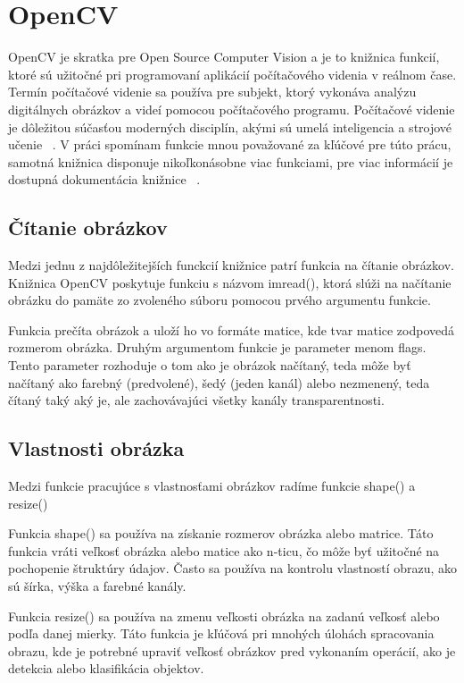 \section{OpenCV}
OpenCV je skratka pre Open Source Computer Vision a je to knižnica funkcií, ktoré sú užitočné pri programovaní 
aplikácií počítačového videnia v reálnom čase. Termín počítačové videnie sa používa pre subjekt, ktorý vykonáva 
analýzu digitálnych obrázkov a videí pomocou počítačového programu. Počítačové videnie je dôležitou súčasťou 
moderných disciplín, akými sú umelá inteligencia a strojové učenie ~\cite{tutorialspoint_opencv}. V práci 
spomínam funkcie mnou považované za kľúčové pre túto prácu, samotná knižnica disponuje nikoľkonásobne viac 
funkciami, pre viac informácií je dostupná dokumentácia knižnice ~\cite{documentation_opencv}.

\subsection{Čítanie obrázkov}
Medzi jednu z najdôležitejších funckcií knižnice patrí funkcia na čítanie obrázkov. Knižnica OpenCV poskytuje 
funkciu s názvom imread(), ktorá slúži na načítanie obrázku do pamäte zo zvoleného súboru pomocou prvého argumentu 
funkcie.  

Funkcia prečíta obrázok a uloží ho vo formáte matice, kde tvar matice zodpovedá rozmerom obrázka. Druhým argumentom 
funkcie je parameter menom flags. Tento parameter rozhoduje o tom ako je obrázok načítaný, teda môže byť načítaný 
ako farebný (predvolené), šedý (jeden kanál) alebo nezmenený, teda čítaný taký aký je, ale zachovávajúci všetky 
kanály transparentnosti.

\subsection{Vlastnosti obrázka}
Medzi funkcie pracujúce s vlastnosťami obrázkov radíme funkcie shape() a resize()

Funkcia shape() sa používa na získanie rozmerov obrázka alebo matrice. Táto funkcia vráti veľkosť obrázka alebo 
matice ako n-ticu, čo môže byť užitočné na pochopenie štruktúry údajov. Často sa používa na kontrolu vlastností 
obrazu, ako sú šírka, výška a farebné kanály.

Funkcia resize() sa používa na zmenu veľkosti obrázka na zadanú veľkosť alebo podľa danej mierky. Táto funkcia 
je kľúčová pri mnohých úlohách spracovania obrazu, kde je potrebné upraviť veľkosť obrázkov pred vykonaním operácií, 
ako je detekcia alebo klasifikácia objektov.


